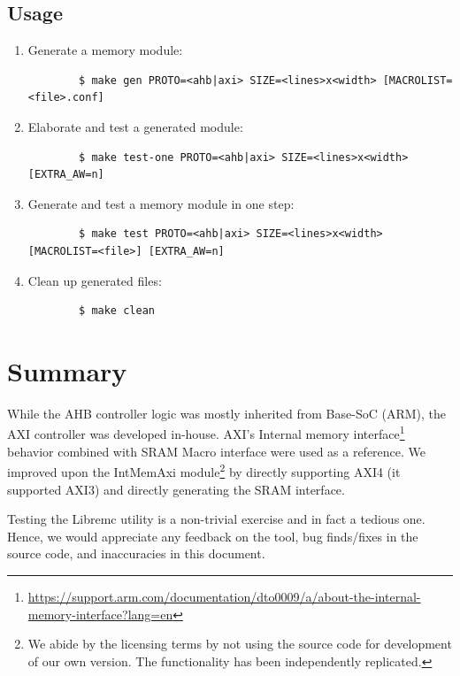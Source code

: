 \subsection{Usage} 

\begin{enumerate}
    \item Generate a memory module: \begin{verbatim}
        $ make gen PROTO=<ahb|axi> SIZE=<lines>x<width> [MACROLIST=<file>.conf]
    \end{verbatim}
    \item Elaborate and test a generated module: \begin{verbatim}
        $ make test-one PROTO=<ahb|axi> SIZE=<lines>x<width> [EXTRA_AW=n]      
    \end{verbatim} 
    \item Generate and test a memory module in one step: \begin{verbatim}
        $ make test PROTO=<ahb|axi> SIZE=<lines>x<width> [MACROLIST=<file>] [EXTRA_AW=n]
    \end{verbatim}
    \item Clean up generated files: \begin{verbatim}
        $ make clean
    \end{verbatim} 
\end{enumerate}

\section{Summary}

While the AHB controller logic was mostly inherited from Base-SoC (ARM), the AXI controller was developed in-house. AXI's Internal memory interface\footnote{\href{https://support.arm.com/documentation/dto0009/a/about-the-internal-memory-interface?lang=en}{https://support.arm.com/documentation/dto0009/a/about-the-internal-memory-interface?lang=en}} behavior combined with SRAM Macro interface were used as a reference. We improved upon the IntMemAxi module\footnote{We abide by the licensing terms by not using the source code for development of our own version. The functionality has been independently replicated.} by directly supporting AXI4 (it supported AXI3) and directly generating the SRAM interface. 

\begin{docwarning}
Testing the Libremc utility is a non-trivial exercise and in fact a tedious one. Hence, we would appreciate any feedback on the tool, bug finds/fixes in the source code, and inaccuracies in this document.
\end{docwarning}